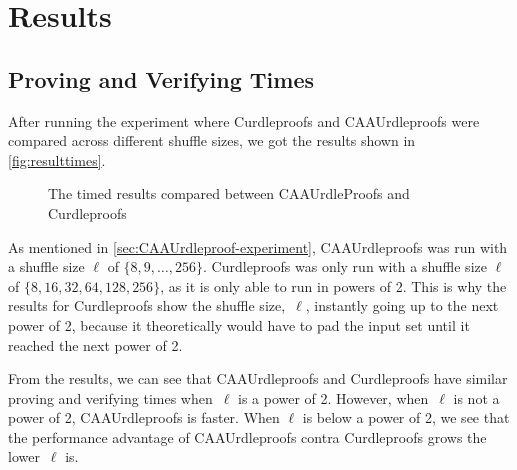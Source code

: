 \section{Results}\label{sec:results}
\subsection{Proving and Verifying Times}\label{subsec:results:provingverifying}

After running the experiment where Curdleproofs and CAAUrdleproofs were compared across different shuffle sizes, we got the results shown in \autoref{fig:resulttimes}.

\begin{figure}[!htb]
    \centering
    \qquad
    \caption{The timed results compared between CAAUrdleProofs and Curdleproofs}%
    \label{fig:resulttimes}%
\end{figure}

As mentioned in \autoref{sec:CAAUrdleproof-experiment}, CAAUrdleproofs was run with a shuffle size $\ell$ of $\{8,9,\dots,256\}$.
Curdleproofs was only run with a shuffle size $\ell$ of $\{8,16,32,64,128,256\}$, as it is only able to run in powers of 2.
This is why the results for Curdleproofs show the shuffle size,~$\ell$, instantly going up to the next power of 2, because it theoretically would have to pad the input set until it reached the next power of 2.

From the results, we can see that CAAUrdleproofs and Curdleproofs have similar proving and verifying times when~$\ell$ is a power of 2.
However, when~$\ell$ is not a power of 2, CAAUrdleproofs is faster.
When $\ell$ is below a power of 2, we see that the performance advantage of CAAUrdleproofs contra Curdleproofs grows the lower~$\ell$ is.

